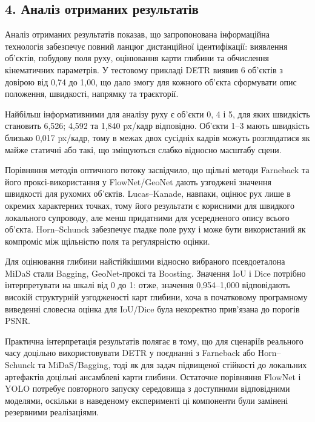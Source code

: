 \documentclass[
]{article}
\begin{document}
\subsection{4. Аналіз отриманих результатів}\label{ux430ux43dux430ux43bux456ux437-ux43eux442ux440ux438ux43cux430ux43dux438ux445-ux440ux435ux437ux443ux43bux44cux442ux430ux442ux456ux432}

Аналіз отриманих результатів показав, що запропонована інформаційна технологія забезпечує повний ланцюг дистанційної ідентифікації: виявлення об'єктів, побудову поля руху, оцінювання карти глибини та обчислення кінематичних параметрів. У тестовому прикладі DETR виявив 6 об'єктів з довірою від 0,74 до 1,00, що дало змогу для кожного об'єкта сформувати опис положення, швидкості, напрямку та траєкторії.

Найбільш інформативними для аналізу руху є об'єкти 0, 4 і 5, для яких швидкість становить 6,526; 4,592 та 1,840 px/кадр відповідно. Об'єкти 1--3 мають швидкість близько 0,017 px/кадр, тому в межах двох сусідніх кадрів можуть розглядатися як майже статичні або такі, що зміщуються слабко відносно масштабу сцени.

Порівняння методів оптичного потоку засвідчило, що щільні методи Farneback та його проксі-використання у FlowNet/GeoNet дають узгоджені значення швидкості для рухомих об'єктів. Lucas--Kanade, навпаки, оцінює рух лише в окремих характерних точках, тому його результати є корисними для швидкого локального супроводу, але менш придатними для усередненого опису всього об'єкта. Horn--Schunck забезпечує гладке поле руху і може бути використаний як компроміс між щільністю поля та регулярністю оцінки.

Для оцінювання глибини найстійкішими відносно вибраного псевдоеталона MiDaS стали Bagging, GeoNet-проксі та Boosting. Значення IoU і Dice потрібно інтерпретувати на шкалі від 0 до 1: отже, значення 0,954--1,000 відповідають високій структурній узгодженості карт глибини, хоча в початковому програмному виведенні словесна оцінка для IoU/Dice була некоректно прив'язана до порогів PSNR.

Практична інтерпретація результатів полягає в тому, що для сценаріїв реального часу доцільно використовувати DETR у поєднанні з Farneback або Horn--Schunck та MiDaS/Bagging, тоді як для задач підвищеної стійкості до локальних артефактів доцільні ансамблеві карти глибини. Остаточне порівняння FlowNet і YOLO потребує повторного запуску середовища з доступними відповідними моделями, оскільки в наведеному експерименті ці компоненти були замінені резервними реалізаціями.
\end{document}
